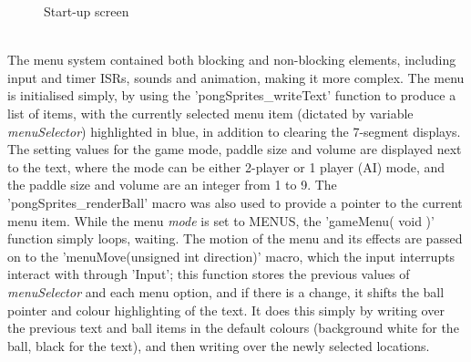 \documentclass[a4paper,12pt]{article}
\begin{document}
\begin{flushleft}
\begin{figure}[H]
  \caption{Start-up screen}
\end{figure}
\- \\
The menu system contained both blocking and non-blocking elements, including input and timer ISRs, sounds and animation, making it more complex. The menu is initialised simply, by using the 'pongSprites\_writeText' function to produce a list of items, with the currently selected menu item (dictated by variable \textit{menuSelector}) highlighted in blue, in addition to clearing the 7-segment displays. The setting values for the game mode, paddle size and volume are displayed next to the text, where the mode can be either 2-player or 1 player (AI) mode, and the paddle size and volume are an integer from 1 to 9. The 'pongSprites\_renderBall' macro was also used to provide a pointer to the current menu item. While the menu \textit{mode} is set to MENUS, the 'gameMenu( void )' function simply loops, waiting. The motion of the menu and its effects are passed on to the 'menuMove(unsigned int direction)' macro, which the input interrupts interact with through 'Input'; this function stores the previous values of \textit{menuSelector} and each menu option, and if there is a change, it shifts the ball pointer and colour highlighting of the text. It does this simply by writing over the previous text and ball items in the default colours (background white for the ball, black for the text), and then writing over the newly selected locations. 


\end{flushleft}
\end{document}
